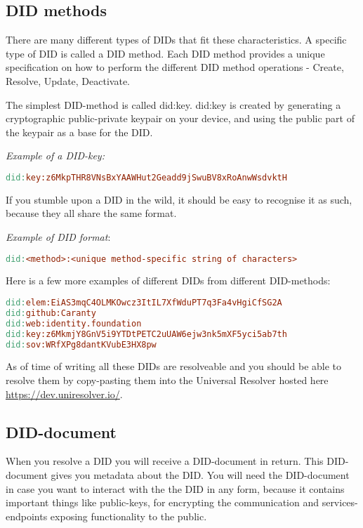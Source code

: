 \subsection{DID methods}

There are many different types of DIDs that fit these characteristics. A
specific type of DID is called a DID method. Each DID method provides a
unique specification on how to perform the different
DID method operations - Create, Resolve, Update, Deactivate.

The simplest DID-method is called did:key. did:key is created by
generating a cryptographic public-private keypair on your device, and
using the public part of the keypair as a base for the DID.

\emph{Example of a DID-key:}

\begin{lstlisting}[language=make]
did:key:z6MkpTHR8VNsBxYAAWHut2Geadd9jSwuBV8xRoAnwWsdvktH
\end{lstlisting}

If you stumble upon a DID in the wild, it should be easy to recognise it
as such, because they all share the same format.

\emph{Example of DID format}:

\begin{lstlisting}[language=make]
did:<method>:<unique method-specific string of characters>
\end{lstlisting}

Here is a few more examples of different DIDs from different
DID-methods:

\begin{lstlisting}[language=make]
did:elem:EiAS3mqC4OLMKOwcz3ItIL7XfWduPT7q3Fa4vHgiCfSG2A
did:github:Caranty
did:web:identity.foundation
did:key:z6MkmjY8GnV5i9YTDtPETC2uUAW6ejw3nk5mXF5yci5ab7th
did:sov:WRfXPg8dantKVubE3HX8pw
\end{lstlisting}

As of time of writing all these DIDs are resolveable and you should be
able to resolve them by copy-pasting them into the Universal Resolver hosted here
\url{https://dev.uniresolver.io/}.



\subsection{DID-document} 

When you resolve a DID you will receive a DID-document in return. This
DID-document gives you metadata about the DID. You will need the
DID-document in case you want to interact with the the DID in any form,
because it contains important things like public-keys, for encrypting
the communication and services-endpoints exposing functionality to the
public.

